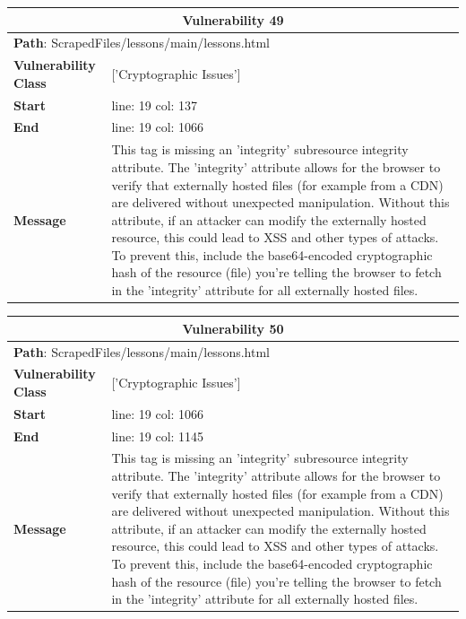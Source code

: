 \documentclass[12pt]{article}
\begin{document}
\begin{table}[!h]
\centering
\renewcommand{\arraystretch}{1.3}
\begin{tabular}{|l|p{10cm}|}
\hline
\multicolumn{2}{|c|}{\textbf{Vulnerability 49}} \\
\hline
\multicolumn{2}{|l|}{\textbf{Path}: ScrapedFiles/lessons/main/lessons.html} \\
\hline
\textbf{Vulnerability Class} & ['Cryptographic Issues'] \\
\hline
\textbf{Start} & line: 19 \quad col: 137 \\
\hline
\textbf{End} & line: 19 \quad col: 1066 \\
\hline
\textbf{Message} & This tag is missing an 'integrity' subresource integrity attribute. The 'integrity' attribute allows for the browser to verify that externally hosted files (for example from a CDN) are delivered without unexpected manipulation. Without this attribute, if an attacker can modify the externally hosted resource, this could lead to XSS and other types of attacks. To prevent this, include the base64-encoded cryptographic hash of the resource (file) you're telling the browser to fetch in the 'integrity' attribute for all externally hosted files. \\
\hline
\end{tabular}
\end{table}
\vspace{0.7cm}
\FloatBarrier
\begin{table}[!h]
\centering
\renewcommand{\arraystretch}{1.3}
\begin{tabular}{|l|p{10cm}|}
\hline
\multicolumn{2}{|c|}{\textbf{Vulnerability 50}} \\
\hline
\multicolumn{2}{|l|}{\textbf{Path}: ScrapedFiles/lessons/main/lessons.html} \\
\hline
\textbf{Vulnerability Class} & ['Cryptographic Issues'] \\
\hline
\textbf{Start} & line: 19 \quad col: 1066 \\
\hline
\textbf{End} & line: 19 \quad col: 1145 \\
\hline
\textbf{Message} & This tag is missing an 'integrity' subresource integrity attribute. The 'integrity' attribute allows for the browser to verify that externally hosted files (for example from a CDN) are delivered without unexpected manipulation. Without this attribute, if an attacker can modify the externally hosted resource, this could lead to XSS and other types of attacks. To prevent this, include the base64-encoded cryptographic hash of the resource (file) you're telling the browser to fetch in the 'integrity' attribute for all externally hosted files. \\
\hline
\end{tabular}
\end{table}
\end{document}

